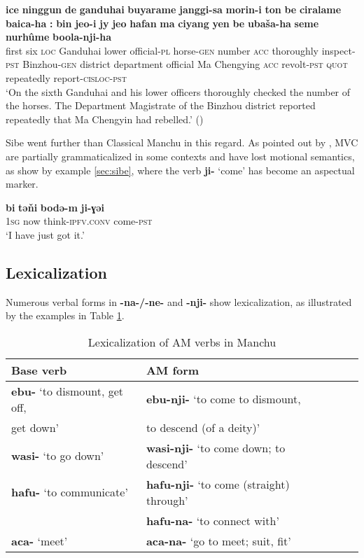 \documentclass{article}
\newcommand{\ipa}[1]{\textbf{{\phon\mbox{#1}}}} %
\begin{document}
\begin{exe}
\ex \label{ex:boolanjiha}
\gll
\ipa{ice} 	\ipa{ninggun} 	\ipa{de} 	\ipa{ganduhai} 	\ipa{buyarame} 	\ipa{janggi-sa} 	\ipa{morin-i} 	\ipa{ton} 	\ipa{be} 	\ipa{ciralame} 	\ipa{baica-ha} 	\ipa{:} 	{\ipa{bin} 	\ipa{jeo-i}} 	\ipa{jy} 	\ipa{jeo} 	\ipa{hafan} 	\ipa{ma} 	{\ipa{ciyang} 	\ipa{yen}} 	\ipa{be} 	\ipa{ubaša-ha} 	\ipa{seme} 	\ipa{nurhûme} 	\ipa{boola-nji-ha} 	\\
first six \textsc{loc} Ganduhai lower official-\textsc{pl} horse-\textsc{gen} number \textsc{acc} thoroughly inspect-\textsc{pst} { } Binzhou-\textsc{gen} district department official Ma Chengying \textsc{acc} revolt-\textsc{pst} \textsc{quot} repeatedly report-\textsc{cisloc-pst} \\
\glt `On the sixth Ganduhai and his lower officers thoroughly checked the number of the horses. The Department Magistrate of the Binzhou district reported repeatedly that Ma Chengyin had rebelled.' (\citealt[88/47]{cosmo06dzengseo})
\end{exe}

Sibe went further than Classical Manchu in this regard. As pointed out by \citet[156]{zikmundova13sibe}, MVC are partially grammaticalized in some contexts and have lost motional semantics, as show by example \ref{sec:sibe}, where the verb \ipa{ji-} `come' has become an aspectual marker.

\begin{exe}
\ex \label{sec:sibe}
\gll
\ipa{bi} 	\ipa{tǝňi} 	\ipa{bodǝ-m} 	\ipa{ji-ɣǝi} \\
\textsc{1sg} now think-\textsc{ipfv.conv} come-\textsc{pst} \\
\glt ‘I have just got it.'
\end{exe}


\subsection{Lexicalization} \label{sec:lexicalization}
Numerous verbal forms in \ipa{-na-/-ne-} and \ipa{-nji-} show lexicalization, as illustrated by the examples in Table \ref{tab:lexicalization}.

\begin{table}[h]
\caption{Lexicalization of AM verbs in Manchu} \label{tab:lexicalization} \centering
\begin{tabular}{lllll}
\toprule
Base verb & AM form  \\
\midrule
\ipa{ebu-} ‘to dismount, get off,  & \ipa{ebu-nji-} ‘to come to dismount, \\
get down’& to descend (of a deity)’\\
 \ipa{wasi-} ‘to go down’ & \ipa{wasi-nji-} ‘to come down; to descend’\\
 \ipa{hafu-} ‘to communicate’ & \ipa{hafu-nji-} ‘to come (straight) through’ \\
 & \ipa{hafu-na-} ‘to connect with’\\
 \ipa{aca-} `meet' &  \ipa{aca-na-} `go to meet; suit, fit' \\
 \bottomrule
\end{tabular}
\end{table}
\end{document}
